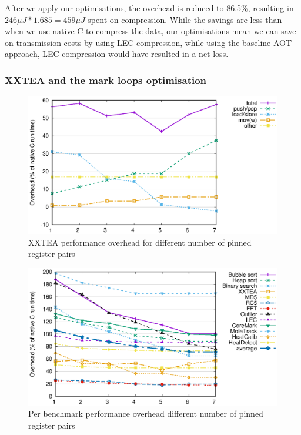 After we apply our optimisations, the overhead is reduced to 86.5\%, resulting in $246 \mu J * 1.685 = 459 \mu J$ spent on compression. While the savings are less than when we use native C to compress the data, our optimisations mean we can save on transmission costs by using LEC compression, while using the baseline AOT approach, LEC compression would have resulted in a net loss.

\subsubsection{XXTEA and the mark loops optimisation}

\begin{figure}
\centering
\includegraphics[width=\mygraphsize]{pinnedregs-performance-xxtea.eps}
\caption{XXTEA performance overhead for different number of pinned register pairs}
\label{fig-performance-pinnedregs-xxtea-per-opcode-category}
\end{figure}

\begin{figure}
\centering
\includegraphics[width=\mygraphsize]{pinnedregs-performance-all-benchmarks.eps}
\caption{Per benchmark performance overhead different number of pinned register pairs}
\label{fig-performance-pinnedregs-per-benchmark}
\end{figure}

